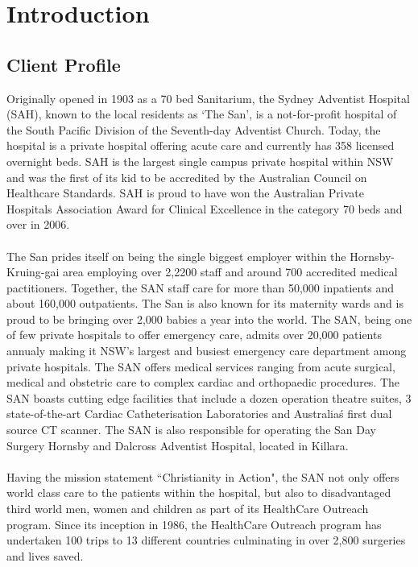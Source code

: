 \section{Introduction}
\subsection{Client Profile}
Originally opened in 1903 as a 70 bed Sanitarium, the Sydney Adventist Hospital (SAH), known to the local residents as `The San', is a not-for-profit hospital of the South Pacific Division of the Seventh-day Adventist Church.  Today, the hospital is a private hospital offering acute care and currently has 358 licensed overnight beds. SAH is the largest single campus private hospital within NSW and was the first of its kid to be accredited by the Australian Council on Healthcare Standards. SAH is proud to have won the Australian Private Hospitals Association Award for Clinical Excellence in the category 70 beds and over in 2006.
 \\ \\
The San prides itself on being the single biggest employer within the Hornsby-Kruing-gai area employing over 2,2200 staff and around 700 accredited medical pactitioners. Together, the SAN staff care for more than 50,000 inpatients and about 160,000 outpatients. The San is also known for its maternity wards and is proud to be bringing over 2,000 babies a year into the world. The SAN, being one of few private hospitals to offer emergency care, admits over 20,000 patients annualy making it NSW's largest and busiest emergency care department among private hospitals. The SAN offers medical services ranging from acute surgical, medical and obstetric care to complex cardiac and orthopaedic procedures. The SAN boasts cutting edge facilities that include a dozen operation theatre suites, 3 state-of-the-art Cardiac Catheterisation Laboratories and Australia\'s first dual source CT scanner. The SAN is also responsible for operating the San Day Surgery Hornsby and Dalcross Adventist Hospital, located in Killara.
\\ \\
Having the mission statement ``Christianity in Action", the SAN not only offers world class care to the patients within the hospital, but also to disadvantaged third world men, women and children as part of its HealthCare Outreach program. Since its inception in 1986, the HealthCare Outreach program has undertaken 100 trips to 13 different countries culminating in over 2,800 surgeries and lives saved. 

